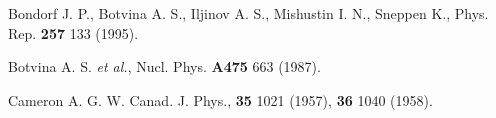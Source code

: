 \begin{thebibliography}{599}

 Bondorf J. P., Botvina A. S., Iljinov A. S., Mishustin I.
N., Sneppen K., Phys. Rep. {\bf 257} 133 (1995).

 Botvina A. S. {\it et al.}, Nucl. Phys. {\bf A475} 663
(1987).

  Cameron A. G. W. Canad. J. Phys., {\bf 35} 1021 (1957), 
{\bf 36} 1040 (1958).

\end{thebibliography}
